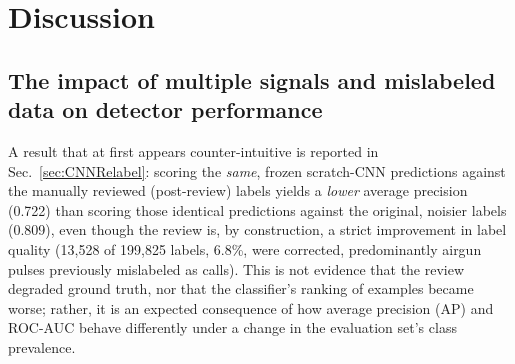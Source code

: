 \documentclass[preprint,NumberedRefs]{JASAnew}
\begin{document}
\section{Discussion}



\subsection{The impact of multiple signals and mislabeled data on detector performance}

A result that at first appears counter-intuitive is reported in
Sec.~\ref{sec:CNNRelabel}: scoring the \emph{same}, frozen scratch-CNN
predictions against the manually reviewed (post-review) labels yields a
\emph{lower} average precision (0.722) than scoring those identical
predictions against the original, noisier labels (0.809), even though the
review is, by construction, a strict improvement in label quality (13,528 of
199,825 labels, 6.8\%, were corrected, predominantly airgun pulses
previously mislabeled as calls). This is not evidence that the review
degraded ground truth, nor that the classifier's ranking of examples became
worse; rather, it is an expected consequence of how average precision (AP)
and ROC-AUC behave differently under a change in the evaluation set's class
prevalence.
\end{document}
